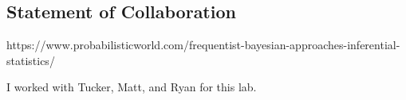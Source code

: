 \documentclass[11pt]{article}
\begin{document}
    \subsection{Statement of
Collaboration}\label{statement-of-collaboration}

    https://www.probabilisticworld.com/frequentist-bayesian-approaches-inferential-statistics/

I worked with Tucker, Matt, and Ryan for this lab.


    
    
    
    
\end{document}
